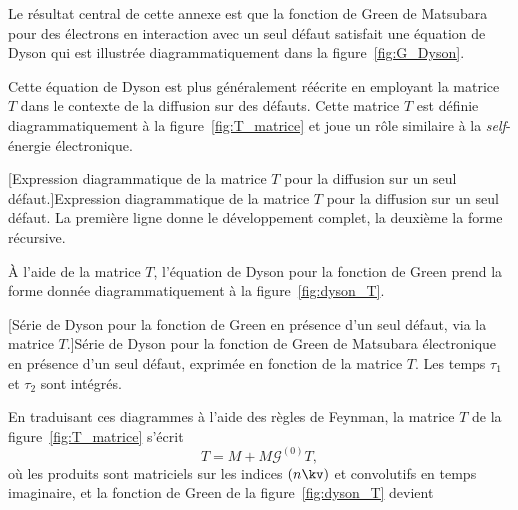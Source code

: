 Le résultat central de cette annexe est que la fonction de Green de Matsubara pour des électrons en interaction avec un seul défaut satisfait une équation de Dyson qui est illustrée diagrammatiquement dans la figure~\ref{fig:G_Dyson}.
\begin{center}
    \vspace{0.5\baselineskip}
    
    \label{fig:G_Dyson}
    \vspace{0.5\baselineskip}
\end{center}
Cette équation de Dyson est plus généralement réécrite en employant la matrice $T$ dans le contexte de la diffusion sur des défauts. Cette matrice $T$ est définie diagrammatiquement à la figure~\ref{fig:T_matrice} et joue un rôle similaire à la \textit{self}-énergie électronique.
\begin{center}
    \vspace{0.5\baselineskip}
    
    [Expression diagrammatique de la matrice $T$ pour la diffusion sur un seul défaut.]{Expression diagrammatique de la matrice $T$ pour la diffusion sur un seul défaut. La première ligne donne le développement complet, la deuxième la forme récursive.}
    \label{fig:T_matrice}
    \vspace{0.5\baselineskip}
\end{center}
À l'aide de la matrice $T$, l'équation de Dyson pour la fonction de Green prend la forme donnée diagrammatiquement à la figure~\ref{fig:dyson_T}.
\begin{center}
    \vspace{0.5\baselineskip}
    
    [Série de Dyson pour la fonction de Green en présence d'un seul défaut, via la matrice $T$.]{Série de Dyson pour la fonction de Green de Matsubara électronique en présence d'un seul défaut, exprimée en fonction de la matrice $T$. Les temps $\tau_1$ et $\tau_2$ sont intégrés.}
    \label{fig:dyson_T}
    \vspace{0.5\baselineskip}
\end{center}
En traduisant ces diagrammes à l'aide des règles de Feynman, la matrice $T$ de la figure~\ref{fig:T_matrice} s'écrit
\begin{equation}
    T = M + M\mathcal{G}^{(0)}T,\label{eqn:T_chap}
\end{equation}
où les produits sont matriciels sur les indices $(n\kv)$ et convolutifs en temps imaginaire, et la fonction de Green de la figure~\ref{fig:dyson_T} devient
